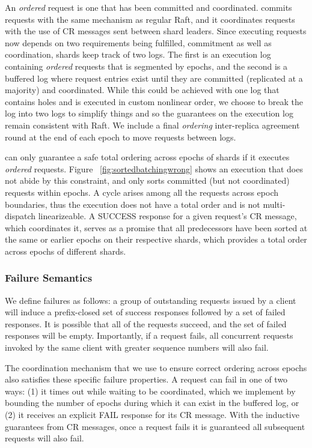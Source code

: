 An \textit{ordered} request is one that has been committed and coordinated. \md commits requests with the same mechanism as regular Raft, and it coordinates requests with the use of CR messages sent between shard leaders. Since executing requests now depends on two requirements being fulfilled, commitment as well as coordination, shards keep track of two logs. The first is an execution log containing \textit{ordered} requests that is segmented by epochs, and the second is a buffered log where request entries exist until they are committed (replicated at a majority) and coordinated. While this could be achieved with one log that contains holes and is executed in custom nonlinear order, we choose to break the log into two logs to simplify things and so the guarantees on the execution log remain consistent with Raft. We include a final \textit{ordering} inter-replica agreement round at the end of each epoch to move requests between logs.

\md can only guarantee a safe total ordering across epochs of shards if it executes \textit{ordered} requests. Figure ~\ref{fig:sortedbatchingwrong} shows an execution that does not abide by this constraint, and only sorts committed (but not coordinated) requests within epochs. A cycle arises among all the requests across epoch boundaries, thus the execution does not have a total order and is not multi-dispatch linearizeable. A SUCCESS response for a given request's CR message, which coordinates it, serves as a promise that all predecessors have been sorted at the same or earlier epochs on their respective shards, which provides a total order across epochs of different shards.

\subsubsection{Failure Semantics}
We define \mdl failures as follows: a group of outstanding requests issued by a client will induce a prefix-closed set of success responses followed by a set of failed responses. It is possible that all of the requests succeed, and the set of failed responses will be empty. Importantly, if a request fails, all concurrent requests invoked by the same client with greater sequence numbers will also fail.

The coordination mechanism that we use to ensure correct ordering across epochs also satisfies these specific failure properties. A request can fail in one of two ways: (1) it times out while waiting to be coordinated, which we implement by bounding the number of epochs during which it can exist in the buffered log, or (2) it receives an explicit FAIL response for its CR message. With the inductive guarantees from CR messages, once a request fails it is guaranteed all subsequent requests will also fail.

